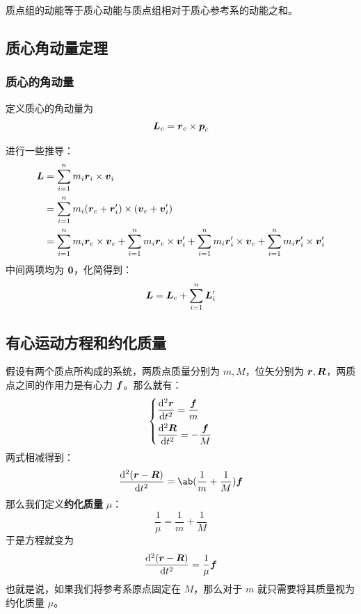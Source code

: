 \begin{theorem}[质心动能定理]
    质点组的动能等于质心动能与质点组相对于质心参考系的动能之和。
\end{theorem}

\subsection{质心角动量定理}

\subsubsection{质心的角动量}

\begin{definition}
    定义质心的角动量为
    $$
    \boldsymbol{L}_c = \boldsymbol{r}_c \times \boldsymbol{p}_c
    $$
\end{definition}

进行一些推导：
$$
\begin{aligned}
    \boldsymbol{L} & = \sum_{i = 1}^n m_i \boldsymbol{r}_i \times \boldsymbol{v}_i \\
    & = \sum_{i = 1}^{n} m_i (\boldsymbol{r}_c + \boldsymbol{r}_i') \times (\boldsymbol{v}_c + \boldsymbol{v}_i') \\
    & = \sum_{i = 1}^{n} m_i \boldsymbol{r}_c \times \boldsymbol{v}_c + \sum_{i = 1}^{n} m_i \boldsymbol{r}_c \times \boldsymbol{v}_i' + \sum_{i = 1}^{n} m_i \boldsymbol{r}_i' \times \boldsymbol{v}_c + \sum_{i = 1}^{n} m_i \boldsymbol{r}_i' \times \boldsymbol{v}_i'
\end{aligned}
$$
中间两项均为 $\boldsymbol{0}$，化简得到：
$$
\boldsymbol{L} = \boldsymbol{L}_c + \sum_{i = 1}^{n} \boldsymbol{L}_i'
$$

\subsection{有心运动方程和约化质量}

假设有两个质点所构成的系统，两质点质量分别为 $m, M$，位矢分别为 $\boldsymbol{r}, \boldsymbol{R}$，两质点之间的作用力是有心力 $\boldsymbol{f}$。那么就有：
$$
\begin{dcases}
    \dv[2]{\boldsymbol{r}}{t} = \frac{\boldsymbol{f}}{m} \\
    \dv[2]{\boldsymbol{R}}{t} = -\frac{\boldsymbol{f}}{M} \\
\end{dcases}
$$
两式相减得到：
$$
\dv[2]{(\vect{r} - \vect{R})}{t} = \ab(\frac{1}{m} + \frac{1}{M}) \vect{f}
$$
那么我们定义\textbf{约化质量} $\mu$：
$$
\frac{1}{\mu} = \frac{1}{m} + \frac{1}{M}
$$
于是方程就变为
$$
\dv[2]{(\boldsymbol{r} - \boldsymbol{R})}{t} = \frac{1}{\mu} \boldsymbol{f}
$$
也就是说，如果我们将参考系原点固定在 $M$，那么对于 $m$ 就只需要将其质量视为约化质量 $\mu$。

